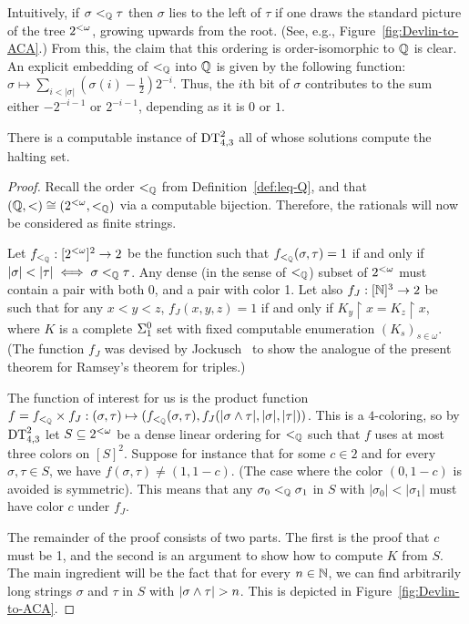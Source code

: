 Intuitively, if $\sigma<_{\mathbb{Q}}\tau$ then $\sigma$ lies to the left of $\tau$ if one draws the standard picture of the tree ${2^{<\omega}}$, growing upwards from the root. (See, e.g., Figure~\ref{fig:Devlin-to-ACA}.) From this, the claim that this ordering is order-isomorphic to $\mathbb{Q}$ is clear. An explicit embedding of $<_{\mathbb{Q}}$ into $\mathbb{Q}$ is given by the following function: $\sigma\mapsto\sum_{i<|\sigma|}(\sigma(i)-\frac12)2^{-i}$. Thus, the $i$th bit of $\sigma$ contributes to the sum either $-2^{-i-1}$ or $2^{-i-1}$, depending as it is $0$ or $1$.

\begin{theorem}\label{th:lower-bound-devlin}
  There is a computable instance of $\mathrm{DT}^{2}_{4,3}$ all of whose solutions compute the halting set.
\end{theorem}
\begin{proof}
  Recall the order $<_{\mathbb{Q}}$ from Definition~\ref{def:leq-Q}, and that $(\mathbb{Q}, <)\cong({2^{<\omega}}, <_{\mathbb{Q}})$ via a computable bijection. Therefore, the rationals will now be considered as finite strings. %

  Let $f_{<_{\mathbb{Q}}}:[{2^{<\omega}}]^2\to2$ be the function such that $f_{<_{\mathbb{Q}}}(\sigma, \tau)=1$ if and only if $|\sigma|<|\tau|\iff \sigma<_{\Qb}\tau$. Any dense (in the sense of $<_{\mathbb{Q}}$) subset of ${2^{<\omega}}$ must contain a pair with both 0, and a pair with color 1. Let also $f_J:[\mathbb{N}]^3\to2$ be such that for any $x<y<z$, $f_J(x,y,z)=1$ if and only if $K_y\upharpoonright x = K_z\upharpoonright x$, where $K$ is a complete $\Sigma^{0}_{1}$ set with fixed computable enumeration $(K_s)_{s \in \omega}$. (The function $f_J$ was devised by Jockusch~\cite[Theorem 5.7]{Jockusch1972Ramseys} to show the analogue of the present theorem for Ramsey's theorem for triples.)

  The function of interest for us is the product function $f=f_{<_{\mathbb{Q}}}\times f_J:(\sigma,\tau)\mapsto ( f_{<_{\mathbb{Q}}}(\sigma, \tau),f_J(|\sigma\wedge\tau|, |\sigma|, |\tau|))$. This is a $4$-coloring, so by $\mathrm{DT}^{2}_{4,3}$ let $S\subseteq{2^{<\omega}}$ be a dense linear ordering for $<_{\mathbb{Q}}$ such that $f$ uses at most three colors on $[S]^2$. Suppose for instance that for some $c \in 2$ and for every $\sigma,\tau\in S$,  we have $f(\sigma,\tau)\neq(1, 1-c)$. (The case where the color $(0, 1-c)$ is avoided is symmetric). This means that any $\sigma_0<_{\mathbb{Q}}\sigma_1$ in $S$ with $|\sigma_0|<|\sigma_1|$ must have color $c$ under $f_J$.

  The remainder of the proof consists of two parts. The first is the proof that $c$ must be 1, and the second is an argument to show how to compute $K$ from $S$. The main ingredient will be the fact that for every $n\in\mathbb{N}$, we can find arbitrarily long strings $\sigma$ and $\tau$ in $S$ with $|\sigma \wedge \tau| > n$. This is depicted in Figure~\ref{fig:Devlin-to-ACA}.


\end{proof}
